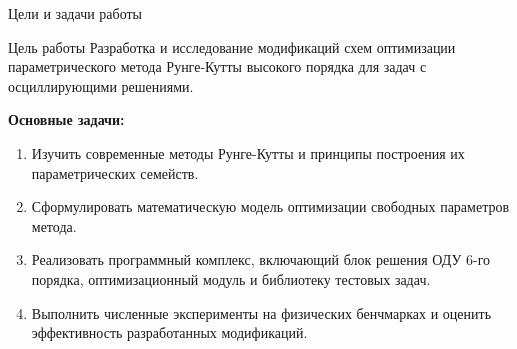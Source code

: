 \begin{frame}{Цели и задачи работы}
	\begin{block}{Цель работы}
		Разработка и исследование модификаций схем оптимизации параметрического метода Рунге-Кутты высокого порядка для задач с осциллирующими решениями.
	\end{block}
	
	\vspace{0.15cm}
	
	\textbf{Основные задачи:} 
	\begin{enumerate}
		\item Изучить современные методы Рунге-Кутты и принципы построения их параметрических семейств.
		\item Сформулировать математическую модель оптимизации свободных параметров метода.
		\item Реализовать программный комплекс, включающий блок решения ОДУ 6-го порядка, оптимизационный модуль и библиотеку тестовых задач.
		\item Выполнить численные эксперименты на физических бенчмарках и оценить эффективность разработанных модификаций.
	\end{enumerate}
\end{frame}